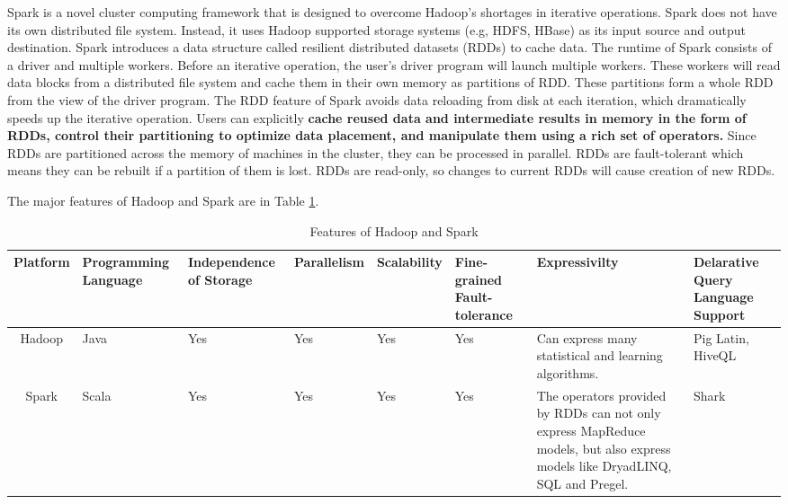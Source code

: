 \documentclass[12pt,conference,letterpaper]{IEEEtran}
\begin{document}
 
Spark is a novel cluster computing framework that is designed to overcome Hadoop's shortages in iterative operations. Spark does not have its own distributed file system. Instead, it uses Hadoop supported storage systems (e.g, HDFS, HBase) as its input source and output destination.  Spark introduces a data structure called resilient distributed datasets (RDDs)  to cache data. The runtime of Spark consists of a driver and multiple workers. Before an iterative operation, the user's driver program will launch multiple workers. These workers will read data blocks from a distributed file system and cache them in their own memory as partitions of RDD. These partitions form a whole RDD from the view of the driver program. The RDD feature of Spark avoids data reloading from disk at each iteration, which dramatically speeds up the iterative operation. Users can explicitly {\bf cache reused data and intermediate results in memory in the form of RDDs, control their partitioning to optimize data placement, and manipulate them using a rich set of operators.} Since RDDs are partitioned across the memory of machines in the cluster, they can be processed in parallel. RDDs are fault-tolerant which means they can be rebuilt if a partition of them is lost. RDDs are read-only, so changes to current RDDs will cause creation of new RDDs.


The major features of Hadoop and Spark are in Table \ref{tab:feature_hdpspk}.

  \begin{table}[!t]
  \renewcommand{\arraystretch}{1.3}
  \centering
  \begin{tabular}{|c|m{1.5cm}<{\centering}|m{1.5cm}<{\centering}|m{1.5cm}<{\centering}|m{1.5cm}<{\centering}|m{2cm}<{\centering}|m{4cm}<{\centering}|m{2cm}<{\centering}|}
  \hline
  \bfseries Platform & \bfseries Programming Language & \bfseries Independence of Storage & \bfseries Parallelism & \bfseries Scalability & \bfseries Fine-grained Fault-tolerance & \bfseries Expressivilty & \bfseries Delarative Query Language Support\\
  \hline
  Hadoop & Java & Yes & Yes & Yes & Yes & Can express many statistical and learning algorithms. & Pig Latin, HiveQL \\
  \hline
  Spark & Scala & Yes & Yes & Yes & Yes  &The operators provided by RDDs can not only express MapReduce models, but also express models like DryadLINQ, SQL and Pregel. & Shark \\
  \hline
  \end{tabular}
  \caption{Features of Hadoop and Spark}
  \label{tab:feature_hdpspk}
  \end{table}
\end{document}
